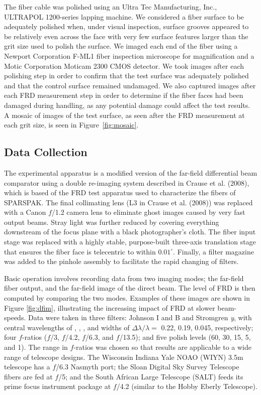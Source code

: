 The fiber cable was polished using an Ultra Tec Manufacturing, Inc.,
ULTRAPOL 1200-series lapping machine.  We considered a fiber surface
to be adequately polished when, under visual inspection, surface
grooves appeared to be relatively even across the face with very few
surface features larger than the grit size used to polish the surface.
We imaged each end of the fiber using a Newport Corporation F-ML1
fiber inspection microscope for magnification and a Motic Corporation
Moticam 2300 CMOS detector.  We took images after each polishing step
in order to confirm that the test surface was adequately polished and
that the control surface remained undamaged.  We also captured images
after each FRD measurement step in order to determine if the fiber
faces had been damaged during handling, as any potential damage could
affect the test results.  A mosaic of images of the test surface, as
seen after the FRD measurement at each grit size, is seen in
Figure~\ref{fig:mosaic}.


\subsection{Data Collection}
\label{sec:direct}
The experimental apparatus is a modified version of the far-field
differential beam comparator using a double re-imaging system
described in Crause et al. (2008)\cite{Crause_08}, which is
based of the FRD test apparatus used to characterize the fibers of
SPARSPAK\cite{Mab_04}. The final collimating lens (L3 in Crause et
al. (2008)\cite{Crause_08}) was replaced with a Canon $f$/1.2 camera
lens to eliminate ghost images caused by very fast output beams. Stray
light was further reduced by covering everything downstream of the
focus plane with a black photographer's cloth. The fiber input stage
was replaced with a highly stable, purpose-built three-axis
translation stage that ensures the fiber face is telecentric to within
$0.01^{\circ}$. Finally, a filter magazine was added to the pinhole
assembly to facilitate the rapid changing of filters.

Basic operation involves recording data from two imaging modes; the
far-field fiber output, and the far-field image of the direct
beam. The level of FRD is then computed by comparing the two modes.
Examples of these images are shown in Figure \ref{fig:dfim},
illustrating the increasing impact of FRD at slower beam-speeds. Data
were taken in three filters: Johnson I and B and Stromgren \emph{y},
with central wavelengths of \filtI, \filtB, \filty, and widths of
$\Delta\lambda/\lambda=$ 0.22, 0.19, 0.045, respectively; four
$f$-ratios ($f$/3, $f$/4.2, $f$/6.3, and $f$/13.5); and five polish
levels (60, 30, 15, 5, and 1\mum). The range in $f$-ratios was chosen
so that results are applicable to a wide range of telescope
designs. The Wisconsin Indiana Yale NOAO (WIYN) 3.5m telescope has a
$f$/6.3 Nasmyth port; the Sloan Digital Sky Survey Telescope fibers
are fed at $f$/5; and the South African Large Telescope (SALT) feeds its
prime focus instrument package at $f$/4.2 (similar to the Hobby Eberly
Telescope).


